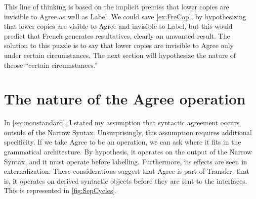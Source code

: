 \documentclass[MilwayThesis]{subfiles}
\begin{document}
This line of thinking is based on the implicit premiss that lower copies are invisible to Agree as well as Label.
We could save \cref{ex:FreCop}, by hypothesizing that lower copies are visible to Agree and invisible to Label, but this would predict that French generates resultatives, clearly an unwanted result.
The solution to this puzzle is to say that lower copies are invisible to Agree only under certain circumstances.
The next section will hypothesize the nature of theose ``certain circumstances.''

\section{The nature of the Agree operation}

In \cref{sec:nonstandard}, I stated my assumption that syntactic agreement occurs outside of the Narrow Syntax.
Unsurprisingly, this assumption requires additional specificity.
If we take Agree to be an operation, we can ask where it fits in the grammatical architecture.
By hypothesis, it operates on the output of the Narrow Syntax, and it must operate before labelling.
Furthermore, its effects are seen in externalization.
These considerations suggest that Agree is part of Transfer, that is, it operates on derived syntactic objects before they are sent to the interfaces.
This is represented in \cref{fig:SepCycles}.
%
%
%
\end{document}
